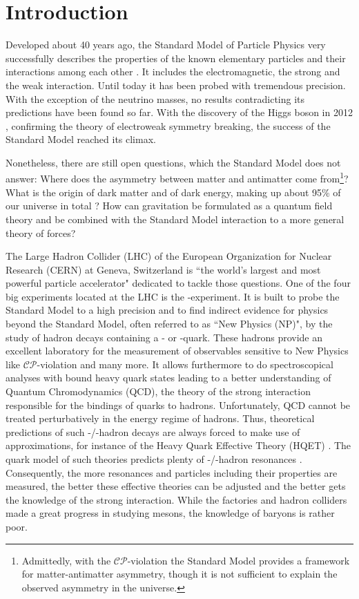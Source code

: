 \chapter{Introduction}
\label{sec:Introduction}
Developed about 40 years ago, the Standard Model of Particle Physics very successfully describes the properties of the known elementary particles and their interactions among each other \cite{SM_Glashow, SM_Salam, SM_Weinberg}.
It includes the electromagnetic, the strong and the weak interaction.
Until today it has been probed with tremendous precision.
With the exception of the neutrino masses, no results contradicting its predictions have been found so far.
With the discovery of the Higgs boson in 2012 \cite{Higgs_ATLAS, Higgs_CMS}, confirming the theory of electroweak symmetry breaking, the success of the Standard Model reached its climax.

Nonetheless, there are still open questions, which the Standard Model does not answer:
Where does the asymmetry between matter and antimatter come from\footnote{Admittedly, with the $\mathcal{CP}$-violation the Standard Model provides a framework for matter-antimatter asymmetry, though it is not sufficient to explain the observed asymmetry in the universe.}?
What is the origin of dark matter and of dark energy, making up about 95\% of our universe in total \cite{Planck_Universe}?
How can gravitation be formulated as a quantum field theory and be combined with the Standard Model interaction to a more general theory of forces?

The Large Hadron Collider (LHC) of the European Organization for Nuclear Research (CERN) at Geneva, Switzerland is ``the world's largest and most powerful particle accelerator" \cite{CERN_LHC_web} dedicated to tackle those questions.
One of the four big experiments located at the LHC is the \lhcb-experiment.
It is built to probe the Standard Model to a high precision and to find indirect evidence for physics beyond the Standard Model, often referred to as ``New Physics (NP)", by the study of hadron decays containing a \bquark- or \cquark-quark.
These hadrons provide an excellent laboratory for the measurement of observables sensitive to New Physics like $\mathcal{CP}$-violation and many more.
It allows furthermore to do spectroscopical analyses with bound heavy quark states leading to a better understanding of Quantum Chromodynamics (QCD), the theory of the strong interaction responsible for the bindings of quarks to hadrons.
Unfortunately, QCD cannot be treated perturbatively in the energy regime of hadrons.
Thus, theoretical predictions of such \bquark-/\cquark-hadron decays are always forced to make use of approximations, for instance of the Heavy Quark Effective Theory (HQET) \cite{HQET_Introduction}.
The quark model of such theories predicts plenty of \bquark-/\cquark-hadron resonances \cite{cBaryons_Predictions}.
Consequently, the more resonances and particles including their properties are measured, the better these effective theories can be adjusted and the better gets the knowledge of the strong interaction.
While the \B factories and hadron colliders made a great progress in studying \bquark mesons, the knowledge of \bquark baryons is rather poor.

